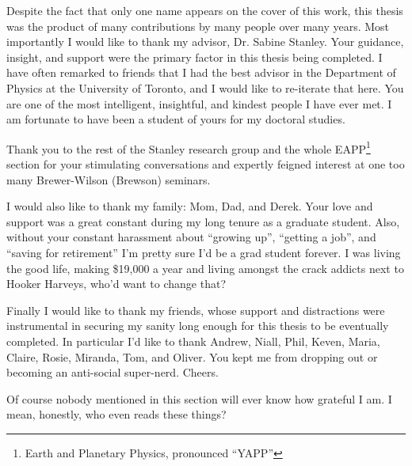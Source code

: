 
\begin{acknowledgements}
Despite the fact that only one name appears on the cover of this work, this thesis was the product of many contributions by many people over many years. Most importantly I would like to thank my advisor, Dr. Sabine Stanley. Your guidance, insight, and support were the primary factor in this thesis being completed. I have often remarked to friends that I had the best advisor in the Department of Physics at the University of Toronto, and I would like to re-iterate that here. You are one of the most intelligent, insightful, and kindest people I have ever met. I am fortunate to have been a student of yours for my doctoral studies.

Thank you to the rest of the Stanley research group and the whole EAPP\footnote{Earth and Planetary Physics, pronounced ``YAPP''} section for your stimulating conversations and expertly feigned interest at one too many Brewer-Wilson (Brewson) seminars.

I would also like to thank my family: Mom, Dad, and Derek. Your love and support was a great constant during my long tenure as a graduate student. Also, without your constant harassment about ``growing up'', ``getting a job'', and ``saving for retirement'' I'm pretty sure I'd be a grad student forever. I was living the good life, making \$19,000 a year and living amongst the crack addicts next to Hooker Harveys, who'd want to change that?

Finally I would like to thank my friends, whose support and distractions were instrumental in securing my sanity long enough for this thesis to be eventually completed. In particular I'd like to thank Andrew, Niall, Phil, Keven, Maria, Claire, Rosie, Miranda, Tom, and Oliver. You kept me from dropping out or becoming an anti-social super-nerd. Cheers.

Of course nobody mentioned in this section will ever know how grateful I am. I mean, honestly, who even reads these things?

\end{acknowledgements}